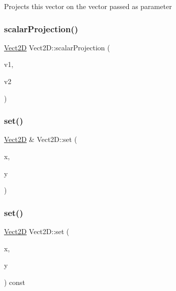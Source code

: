 Projects this vector on the vector passed as parameter \mbox{\label{classVect2D_aee86f314ed5020f7dada62cf2b29a532_aee86f314ed5020f7dada62cf2b29a532}} 
\subsubsection{\texorpdfstring{scalar\+Projection()}{scalarProjection()}\hspace{0.1cm}{\footnotesize\ttfamily [2/2]}}
{\footnotesize\ttfamily \hyperlink{classVect2D}{Vect2D} Vect2\+D\+::scalar\+Projection (\begin{DoxyParamCaption}\item[{const \hyperlink{classVect2D}{Vect2D} \&}]{v1,  }\item[{const \hyperlink{classVect2D}{Vect2D} \&}]{v2 }\end{DoxyParamCaption})\hspace{0.3cm}{\ttfamily [static]}}

\mbox{\label{classVect2D_a0dd170984a57bb034ccf4f939bedf117_a0dd170984a57bb034ccf4f939bedf117}} 
\subsubsection{\texorpdfstring{set()}{set()}\hspace{0.1cm}{\footnotesize\ttfamily [1/3]}}
{\footnotesize\ttfamily \hyperlink{classVect2D}{Vect2D} \& Vect2\+D\+::set (\begin{DoxyParamCaption}\item[{double}]{x,  }\item[{double}]{y }\end{DoxyParamCaption})}

\mbox{\label{classVect2D_a8bf790204c1b93b6569cbe8eb5fd1e0f_a8bf790204c1b93b6569cbe8eb5fd1e0f}} 
\subsubsection{\texorpdfstring{set()}{set()}\hspace{0.1cm}{\footnotesize\ttfamily [2/3]}}
{\footnotesize\ttfamily \hyperlink{classVect2D}{Vect2D} Vect2\+D\+::set (\begin{DoxyParamCaption}\item[{double}]{x,  }\item[{double}]{y }\end{DoxyParamCaption}) const}

